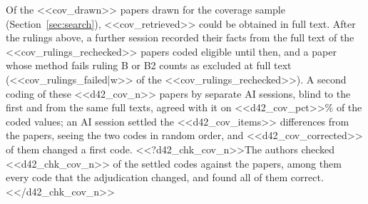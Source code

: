 Of the <<cov_drawn>> papers drawn for the coverage sample (Section~\ref{sec:search}), <<cov_retrieved>> could be obtained in full text. After the rulings above, a further session recorded their facts from the full text of the <<cov_rulings_rechecked>> papers coded eligible until then, and a paper whose method fails ruling B or B2 counts as excluded at full text (<<cov_rulings_failed|w>> of the <<cov_rulings_rechecked>>). A second coding of these <<d42_cov_n>> papers by separate AI sessions, blind to the first and from the same full texts, agreed with it on <<d42_cov_pct>>\% of the coded values; an AI session settled the <<d42_cov_items>> differences from the papers, seeing the two codes in random order, and <<d42_cov_corrected>> of them changed a first code. <<?d42_chk_cov_n>>The authors checked <<d42_chk_cov_n>> of the settled codes against the papers, among them every code that the adjudication changed, and found all of them correct.<</d42_chk_cov_n>>
